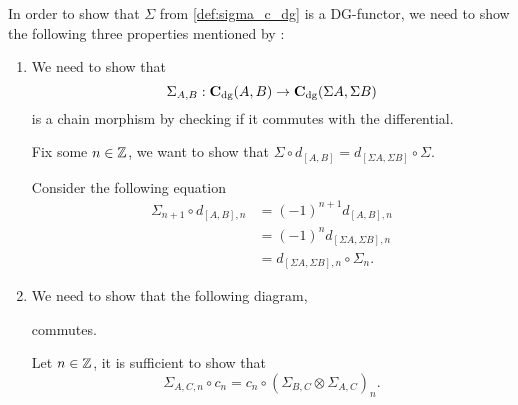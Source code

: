 \begin{remark}
    In order to show that \( \Sigma \) from \autoref{def:sigma_c_dg} is a DG-functor, we need to show the following three properties mentioned by \cite[Definition 6.2.3]{Borceux_1994}:
    \begin{enumerate}
        \item {
            We need to show that
            \[
                \Sigma_{A, B}: \operatorname{\mathbf{C}}_{\operatorname{dg}}(A, B) \to \operatorname{\mathbf{C}}_{\operatorname{dg}}(\Sigma A, \Sigma B)
            \]
            is a chain morphism by checking if it commutes with the differential.

            Fix some \( n \in {\mathbb{Z}} \), we want to show that \( \Sigma \circ d_{[A, B]} = d_{[\Sigma A, \Sigma B]} \circ \Sigma \).

            Consider the following equation
            \begin{align*}
                \Sigma_{n + 1} \circ d_{[A, B], n} &= (-1)^{n + 1} d_{[A, B], n} \\
                &= (-1)^n d_{[\Sigma A, \Sigma B], n} \\
                &= d_{[\Sigma A, \Sigma B], n} \circ \Sigma_n.
            \end{align*}
        }
        \item {
            We need to show that the following diagram,
            \begin{center}
            \end{center}
            commutes.

            Let \( n \in {\mathbb{Z}} \), it is sufficient to show that
            \[
                \Sigma_{A, C, n} \circ c_n = c_n \circ (\Sigma_{B, C} \otimes \Sigma_{A, C})_n.
            \]

}
\end{enumerate}
\end{remark}

